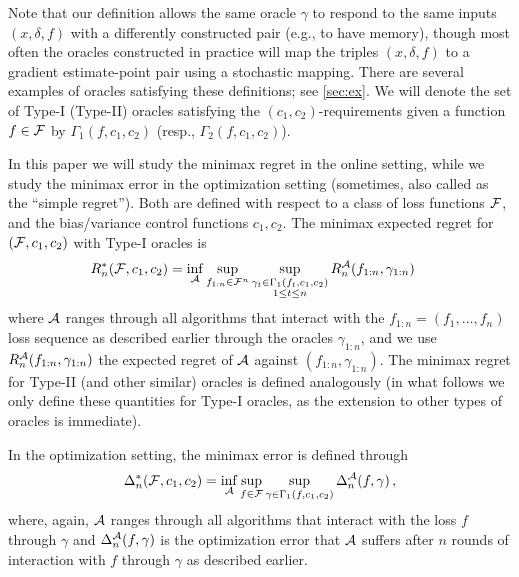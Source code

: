Note that our definition allows the same oracle $\gamma$ to respond to the same inputs $(x,\delta,f)$ with a differently constructed pair (e.g., to have memory), 
though most often the oracles constructed in practice 
will map the triples $(x,\delta,f)$ to a gradient estimate-point pair using a stochastic mapping.
There are several examples of oracles satisfying these definitions; see \cref{sec:ex}.
We will denote the set of Type-I (Type-II) oracles satisfying the $(c_1,c_2)$-requirements given a function $f\in \mathcal{F}$ by $\Gamma_1(f,c_1,c_2)$ (resp., $\Gamma_2(f,c_1,c_2)$). 

In this paper we will study the minimax regret in the online setting, while we study the minimax error in the optimization setting (sometimes, also called as the ``simple regret'').
Both are defined with respect to a class of loss functions $\mathcal{F}$, and the bias/variance control functions $c_1,c_2$.
The minimax expected regret for $(\mathcal{F},c_1,c_2)$ with Type-I oracles is
\begin{align}
\label{eq:minimaxregdef}
\MoveEqLeft
R_n^*(\cF,c_1,c_2) 
= \inf_{\cA} \sup_{f_{1:n}\in \cF^n} 
	\sup_{\substack{\gamma_t \in \Gamma_1(f_t,c_1,c_2)\\1\le t \le n}} R_n^{\cA}(f_{1:n},\gamma_{1:n})
\end{align}
where $\mathcal{A}$ ranges through all algorithms that interact with the $f_{1:n}= (f_1,\dots,f_n)$ loss sequence
as described earlier
through the oracles $\gamma_{1:n}$,
and we use $R_n^{\mathcal{A}}(f_{1:n},\gamma_{1:n})$ the expected regret of $\mathcal{A}$ against $(f_{1:n},\gamma_{1:n})$.
The minimax regret for Type-II (and other similar) oracles is defined analogously (in what follows we only define these quantities for Type-I oracles, as the extension to other types of oracles is immediate).

In the optimization setting, the minimax error is defined through
\begin{align}
\label{eq:minimaxerrdef}
\Delta_n^*(\mathcal{F},c_1,c_2)
= \inf_{\mathcal{A}} \sup_{f \in \mathcal{F}} \sup_{\gamma\in \Gamma_1(f,c_1,c_2)}  \Delta_n^{\mathcal{A}}(f,\gamma)\,,
\end{align}
where, again, $\mathcal{A}$ ranges through all algorithms that interact with the loss $f$ through $\gamma$ and 
$\Delta_n^{\mathcal{A}}(f,\gamma)$ is the optimization error that $\mathcal{A}$ suffers 
after $n$ rounds of interaction with $f$ through $\gamma$ as described earlier.

